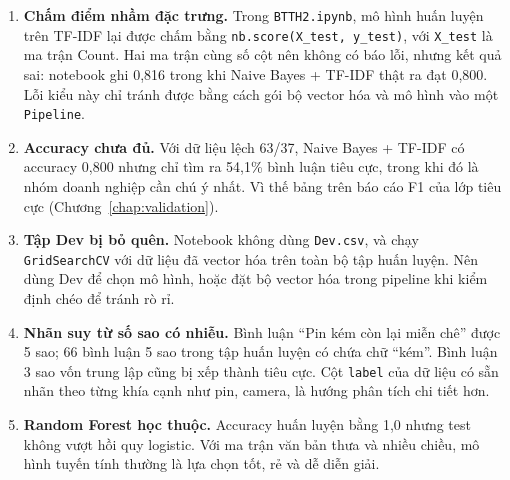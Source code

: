 \begin{enumerate}
    \item \textbf{Chấm điểm nhầm đặc trưng.} Trong \texttt{BTTH2.ipynb}, mô hình huấn luyện trên TF-IDF lại được chấm bằng \texttt{nb.score(X\_test, y\_test)}, với \texttt{X\_test} là ma trận Count. Hai ma trận cùng số cột nên không có báo lỗi, nhưng kết quả sai: notebook ghi 0,816 trong khi Naive Bayes + TF-IDF thật ra đạt 0,800. Lỗi kiểu này chỉ tránh được bằng cách gói bộ vector hóa và mô hình vào một \texttt{Pipeline}.
    \item \textbf{Accuracy chưa đủ.} Với dữ liệu lệch 63/37, Naive Bayes + TF-IDF có accuracy 0,800 nhưng chỉ tìm ra 54,1\% bình luận tiêu cực, trong khi đó là nhóm doanh nghiệp cần chú ý nhất. Vì thế bảng trên báo cáo F1 của lớp tiêu cực (Chương~\ref{chap:validation}).
    \item \textbf{Tập Dev bị bỏ quên.} Notebook không dùng \texttt{Dev.csv}, và chạy \texttt{GridSearchCV} với dữ liệu đã vector hóa trên toàn bộ tập huấn luyện. Nên dùng Dev để chọn mô hình, hoặc đặt bộ vector hóa trong pipeline khi kiểm định chéo để tránh rò rỉ.
    \item \textbf{Nhãn suy từ số sao có nhiễu.} Bình luận ``Pin kém còn lại miễn chê'' được 5 sao; 66 bình luận 5 sao trong tập huấn luyện có chứa chữ ``kém''. Bình luận 3 sao vốn trung lập cũng bị xếp thành tiêu cực. Cột \texttt{label} của dữ liệu có sẵn nhãn theo từng khía cạnh như pin, camera, là hướng phân tích chi tiết hơn.
    \item \textbf{Random Forest học thuộc.} Accuracy huấn luyện bằng 1,0 nhưng test không vượt hồi quy logistic. Với ma trận văn bản thưa và nhiều chiều, mô hình tuyến tính thường là lựa chọn tốt, rẻ và dễ diễn giải.
\end{enumerate}

